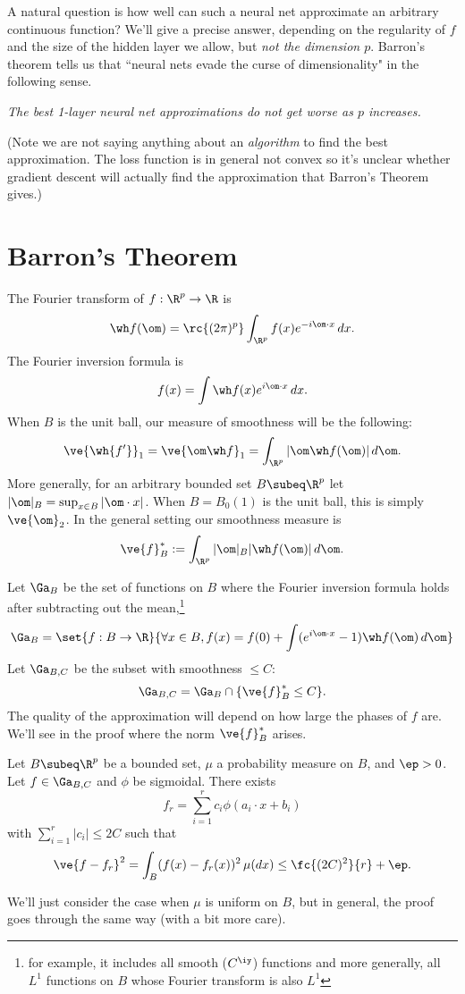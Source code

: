 A natural question is how well can such a neural net approximate an arbitrary continuous function? We'll give a precise answer, depending on the regularity of $f$ and the size of the hidden layer we allow, but {\it not the dimension $p$}.
Barron's theorem tells us that ``neural nets evade the curse of dimensionality" in the following sense.

{\it The best 1-layer neural net approximations do not get worse as $p$ increases.}

(Note we are not saying anything about an {\it algorithm} to find the best approximation. The loss function is in general not convex so it's unclear whether gradient descent will actually find the approximation that Barron's Theorem gives.)


\section{Barron's Theorem}

The Fourier transform of $f:\R^p\to \R$ is
\[
\wh f(\om)=\rc{(2\pi)^p}\int_{\R^p} f(x)e^{-i\om\cdot x}\,dx.
\]
The Fourier inversion formula is
\[
f(x) = \int \wh f(x)e^{i\om\cdot x}\,dx.
\]
When $B$ is the unit ball, our measure of smoothness will be the following:
\[
\ve{\wh{f'}}_1 = \ve{\om \wh f}_1 = \int_{\R^p} |\om \wh f(\om)|\,d\om.
\]
More generally, for an arbitrary bounded set $B\subeq \R^p$ %
let $|\om|_B=\sup_{x\in B} |\om \cdot x|$. When $B=B_0(1)$ is the unit ball, this is simply $\ve{\om}_2$. %
In the general setting our smoothness measure is 
\[
\ve{f}_B^* :=\int_{\R^p} |\om|_B |\wh f(\om)|\,d\om.
\]

Let $\Ga_B$ be the set of functions on $B$ where the Fourier inversion formula holds after subtracting out the mean,\footnote{for example, it includes all smooth ($C^{\iy}$) functions and more generally, all $L^1$ functions on $B$ whose Fourier transform is also $L^1$}
\[
\Ga_B=\set{f:B\to \R}{\forall x\in B, f(x)=f(0) + \int (e^{i\om \cdot x}-1)\wh f(\om)\,d\om}
\]
Let $\Ga_{B,C}$ be the subset with smoothness $\le C$:
\[
\Ga_{B,C}=\Ga_B \cap \{\ve{f}_B^*\le C\}.
\]
The quality of the approximation will depend on how large the phases of $f$ are. We'll see in the proof where the norm $\ve{f}_B^*$ arises.

\begin{thm}[Barron]
Let $B\subeq \R^p$ be a bounded set, $\mu$ a probability measure on $B$, and $\ep>0$.
Let $f\in \Ga_{B,C}$ and $\phi$ be sigmoidal. There exists
\[
f_r=\sum_{i=1}^r c_i\phi(a_i\cdot x+b_i)
\]
with $\sum_{i=1}^r |c_i|\le 2C$ such that 
\[
\ve{f-f_r}^2 =\int_B (f(x)-f_r(x))^2\,\mu(dx) \le \fc{(2C)^2}{r}+\ep.
\]
\end{thm}
We'll just consider the case when $\mu$ is uniform on $B$, but in general, the proof goes through the same way (with a bit more care). %

